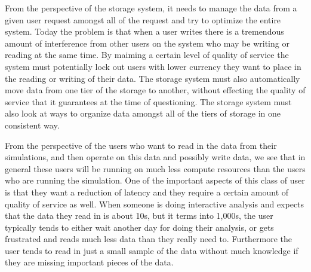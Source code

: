 From the perspective of the storage system, it needs to manage the data from
a given user request amongst all of the request and try to optimize the
entire system. Today the problem is that when a user writes there is a
tremendous amount of interference from other users on the system who may be
writing or reading at the same time. By maiming a certain level of quality
of service the system must potentially lock out users with lower currency
they want to place in the reading or writing of their data. The storage
system must also automatically move data from one tier of the storage to
another, without effecting the quality of service that it guarantees at the
time of questioning. The storage system must also look at ways to organize
data amongst all of the tiers of storage in one consistent way.

From the perspective of the users who want to read in the data from their
simulations, and then operate on this data and possibly write data, we see
that in general these users will be running on much less compute resources
than the users who are running the simulation. One of the important aspects
of this class of user is that they want a reduction of latency and they
require a certain amount of quality of service as well. When someone is
doing interactive analysis and expects that the data they read in is about
10s, but it terms into 1,000s, the user typically tends to either wait
another day for doing their analysis, or gets frustrated and reads much less
data than they really need to. Furthermore the user tends to read in just a
small sample of the data without much knowledge if they are missing
important pieces of the data.

